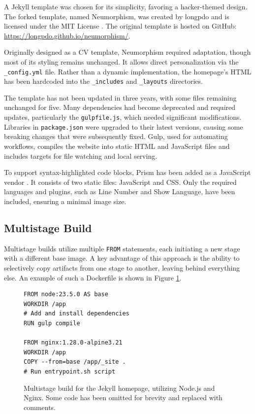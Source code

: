 A Jekyll template was chosen for its simplicity, favoring a hacker-themed design. The forked template, named Neumorphism, was created by longpdo and is licensed under the MIT License \parencite{neumorphism}. The original template is hosted on GitHub: \url{https://longpdo.github.io/neumorphism/}.

Originally designed as a CV template, Neumorphism required adaptation, though most of its styling remains unchanged. It allows direct personalization via the \texttt{\_config.yml} file. Rather than a dynamic implementation, the homepage's HTML has been hardcoded into the \texttt{\_includes} and \texttt{\_layouts} directories.

The template has not been updated in three years, with some files remaining unchanged for five. Many dependencies had become deprecated and required updates, particularly the \texttt{gulpfile.js}, which needed significant modifications. Libraries in \texttt{package.json} were upgraded to their latest versions, causing some breaking changes that were subsequently fixed. Gulp, used for automating workflows, compiles the website into static HTML and JavaScript files and includes targets for file watching and local serving.

To support syntax-highlighted code blocks, Prism has been added as a JavaScript vendor \parencite{prismjs}. It consists of two static files: JavaScript and CSS. Only the required languages and plugins, such as Line Number and Show Language, have been included, ensuring a minimal image size.

\subsection{Multistage Build}
Multistage builds utilize multiple \texttt{FROM} statements, each initiating a new stage with a different base image. A key advantage of this approach is the ability to selectively copy artifacts from one stage to another, leaving behind everything else. An example of such a Dockerfile is shown in Figure \ref{fig:multistage_build}.

\begin{figure}[h]
    \centering
\begin{verbatim}
FROM node:23.5.0 AS base
WORKDIR /app
# Add and install dependencies
RUN gulp compile

FROM nginx:1.28.0-alpine3.21
WORKDIR /app
COPY --from=base /app/_site .
# Run entrypoint.sh script
\end{verbatim}
    \caption{Multistage build for the Jekyll homepage, utilizing Node.js and Nginx. Some code has been omitted for brevity and replaced with comments.}
    \label{fig:multistage_build}
\end{figure}

